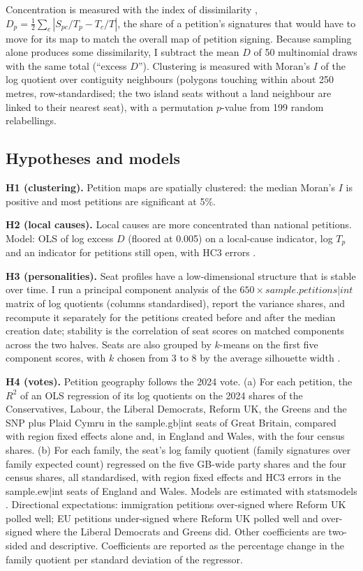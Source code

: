 \documentclass[11pt,a4paper]{article}
\begin{document}
Concentration is measured with the index of dissimilarity \citep{duncan1955}, $D_p=\tfrac12\sum_c|S_{pc}/T_p-T_c/T|$, the share of a petition's signatures that would have to move for its map to match the overall map of petition signing. Because sampling alone produces some dissimilarity, I subtract the mean $D$ of 50 multinomial draws with the same total (``excess $D$''). Clustering is measured with Moran's $I$ \citep{moran1950,anselin1995} of the log quotient over contiguity neighbours (polygons touching within about 250 metres, row-standardised; the two island seats without a land neighbour are linked to their nearest seat), with a permutation $p$-value from 199 random relabellings.

\subsection{Hypotheses and models}
\textbf{H1 (clustering).} Petition maps are spatially clustered: the median Moran's $I$ is positive and most petitions are significant at 5\%.

\textbf{H2 (local causes).} Local causes are more concentrated than national petitions. Model: OLS of log excess $D$ (floored at 0.005) on a local-cause indicator, log $T_p$ and an indicator for petitions still open, with HC3 errors \citep{mackinnon1985}.

\textbf{H3 (personalities).} Seat profiles have a low-dimensional structure that is stable over time. I run a principal component analysis \citep{jolliffecadima2016} of the $650\times{{sample.petitions|int}}$ matrix of log quotients (columns standardised), report the variance shares, and recompute it separately for the petitions created before and after the median creation date; stability is the correlation of seat scores on matched components across the two halves. Seats are also grouped by $k$-means on the first five component scores, with $k$ chosen from 3 to 8 by the average silhouette width \citep{rousseeuw1987}.

\textbf{H4 (votes).} Petition geography follows the 2024 vote. (a) For each petition, the $R^2$ of an OLS regression of its log quotients on the 2024 shares of the Conservatives, Labour, the Liberal Democrats, Reform UK, the Greens and the SNP plus Plaid Cymru in the {{sample.gb|int}} seats of Great Britain, compared with region fixed effects alone and, in England and Wales, with the four census shares. (b) For each family, the seat's log family quotient (family signatures over family expected count) regressed on the five GB-wide party shares and the four census shares, all standardised, with region fixed effects and HC3 errors in the {{sample.ew|int}} seats of England and Wales. Models are estimated with statsmodels \citep{seabold2010}. Directional expectations: immigration petitions over-signed where Reform UK polled well; EU petitions under-signed where Reform UK polled well and over-signed where the Liberal Democrats and Greens did. Other coefficients are two-sided and descriptive. Coefficients are reported as the percentage change in the family quotient per standard deviation of the regressor.
\end{document}
